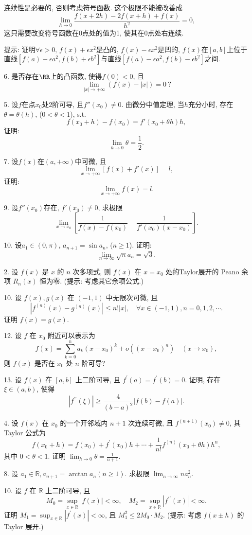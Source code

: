 连续性是必要的, 否则考虑符号函数. 这个极限不能被改善成
\[
\lim_{h\to0}\frac{f(x+2h)-2f(x+h)+f(x)}{h^{2}}=0,
\]
这只需要改变符号函数在0点处的值为1, 使其在0点处右连续.

提示: 证明$\forall\epsilon>0$, $f(x)+\epsilon x^{2}$是凸的, $f(x)-\epsilon x^{2}$是凹的,
$f(x)$在$[a,b]$上位于直线$[f(a)+\epsilon a^{2},f(b)+\epsilon b^{2}]$与直线$[f(a)-\epsilon a^{2},f(b)-\epsilon b^{2}]$之间.

6. 是否存在$\RR$上的凸函数, 使得$f(0)<0$, 且
\[
\lim_{\left|x\right|\to+\infty}(f(x)-\left|x\right|)=0\ ?
\]

5. 设$f$在点$x_{0}$处2阶可导, 且$f''(x_{0})\ne0$. 由微分中值定理, 当$h$充分小时, 存在$\theta=\theta(h)$,
($0<\theta<1$), s.t.
\[
f(x_{0}+h)-f(x_{0})=f'(x_{0}+\theta h)h,
\]
证明:
\[
\lim_{h\to0}\theta=\frac{1}{2}.
\]

7. 设$f(x)$在$(a,+\infty)$中可微, 且
\[
\lim_{x\to+\infty}\left[f(x)+f'(x)\right]=l,
\]
证明:
\[
\lim_{x\to+\infty}f(x)=l.
\]

9. 设$f''(x_{0})$存在, $f'(x_{0})\ne0$, 求极限
\[
\lim_{x\to x_{0}}\left[\frac{1}{f(x)-f(x_{0})}-\frac{1}{f'(x_{0})(x-x_{0})}\right].
\]

10. 设$a_{1}\in(0,\pi)$, $a_{n+1}=\sin a_{n}$, ($n\ge1$). 证明:
\[
\lim_{n\to\infty}\sqrt{n}a_{n}=\sqrt{3}.
\]

2. 设 $f(x)$ 是 $x$ 的 $n$ 次多项式, 则 $f(x)$ 在 $x=x_{0}$ 处的Taylor展开的
Peano 余项 $R_{n}(x)$ 恒为零. (提示: 考虑其它余项公式.)

10. 设 $f(x),g(x)$ 在 $(-1,1)$ 中无限次可微, 且 
\[
\left|f^{(n)}(x)-g^{(n)}(x)\right|\le n!|x|,\quad\forall x\in(-1,1),n=0,1,2,\cdots.
\]
证明 $f(x)=g(x)$.

12. 设 $f$ 在 $x_{0}$ 附近可以表示为 
\[
f(x)=\sum_{k=0}^{n}a_{k}\left(x-x_{0}\right)^{k}+o\left(\left(x-x_{0}\right)^{n}\right)\quad\left(x\rightarrow x_{0}\right),
\]
则 $f(x)$ 是否在 $x_{0}$ 处 $n$ 阶可导? 

13. 设 $f(x)$ 在 $[a,b]$ 上二阶可导, 且 $f^{\prime}(a)=f^{\prime}(b)=0$.
证明, 存在 $\xi\in(a,b)$, 使得
\[
\left|f^{\prime\prime}(\xi)\right|\ge\frac{4}{(b-a)^{2}}|f(b)-f(a)|.
\]

4. 设 $f(x)$ 在 $x_{0}$ 的一个开邻域内 $n+1$ 次连续可微, 且 $f^{(n+1)}\left(x_{0}\right)\neq0$,
其 Taylor 公式为 
\[
f\left(x_{0}+h\right)=f\left(x_{0}\right)+f^{\prime}\left(x_{0}\right)h+\cdots+\frac{1}{n!}f^{(n)}\left(x_{0}+\theta h\right)h^{n},
\]
其中 $0<\theta<1$. 证明 $\lim_{h\rightarrow0}\theta=\frac{1}{n+1}$.

8. 设 $a_{1}\in\mathbb{R},a_{n+1}=\arctan a_{n}(n\geqslant1)$. 求极限
$\lim_{n\rightarrow\infty}na_{n}^{2}$.

10. 设 $f$ 在 $\mathbb{R}$ 上二阶可导, 且 
\[
M_{0}=\sup_{x\in\mathbb{R}}|f(x)|<\infty,\quad M_{2}=\sup_{x\in\mathbb{R}}\left|f^{\prime\prime}(x)\right|<\infty.
\]
证明 $M_{1}=\sup_{x\in\mathbb{R}}\left|f^{\prime}(x)\right|<\infty$,
且 $M_{1}^{2}\leqslant2M_{0}\cdot M_{2}$. (提示: 考虑 $f(x\pm h)$ 的 Taylor
展开.)